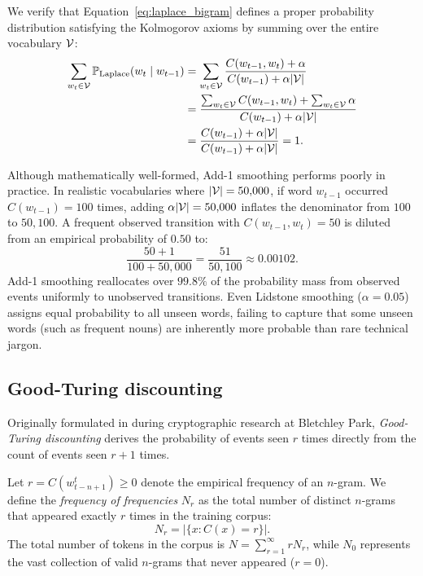 \documentclass[../../main.tex]{subfiles}
\begin{document}
We verify that Equation~\eqref{eq:laplace_bigram} defines a proper probability distribution satisfying the Kolmogorov axioms by summing over the entire vocabulary $\mathcal{V}$:
\begin{align}
\sum_{w_t \in \mathcal{V}} \mathbb{P}_{\text{Laplace}}(w_t \mid w_{t-1}) &= \sum_{w_t \in \mathcal{V}} \frac{C(w_{t-1}, w_t) + \alpha}{C(w_{t-1}) + \alpha |\mathcal{V}|} \notag \\
&= \frac{\sum_{w_t \in \mathcal{V}} C(w_{t-1}, w_t) + \sum_{w_t \in \mathcal{V}} \alpha}{C(w_{t-1}) + \alpha |\mathcal{V}|} \notag \\
&= \frac{C(w_{t-1}) + \alpha |\mathcal{V}|}{C(w_{t-1}) + \alpha |\mathcal{V}|} = 1. \label{eq:laplace_proof}
\end{align}

Although mathematically well-formed, Add-1 smoothing performs poorly in practice. In realistic vocabularies where $|\mathcal{V}| = 50{,}000$, if word $w_{t-1}$ occurred $C(w_{t-1}) = 100$ times, adding $\alpha |\mathcal{V}| = 50{,}000$ inflates the denominator from $100$ to $50{,}100$. A frequent observed transition with $C(w_{t-1}, w_t) = 50$ is diluted from an empirical probability of $0.50$ to:
\[
\frac{50 + 1}{100 + 50{,}000} = \frac{51}{50{,}100} \approx 0.00102.
\]
Add-1 smoothing reallocates over $99.8\%$ of the probability mass from observed events uniformly to unobserved transitions. Even Lidstone smoothing ($\alpha = 0.05$) assigns equal probability to all unseen words, failing to capture that some unseen words (such as frequent nouns) are inherently more probable than rare technical jargon.

\subsection{Good-Turing discounting}
Originally formulated in \cite{good1953} during cryptographic research at Bletchley Park, \emph{Good-Turing discounting} derives the probability of events seen $r$ times directly from the count of events seen $r+1$ times.

Let $r = C(w_{t-n+1}^t) \ge 0$ denote the empirical frequency of an $n$-gram. We define the \emph{frequency of frequencies} $N_r$ as the total number of distinct $n$-grams that appeared exactly $r$ times in the training corpus:
\begin{equation}
\label{eq:gt_nr}
N_r = \left| \{ x : C(x) = r \} \right|.
\end{equation}
The total number of tokens in the corpus is $N = \sum_{r=1}^\infty r N_r$, while $N_0$ represents the vast collection of valid $n$-grams that never appeared ($r=0$).
\end{document}
